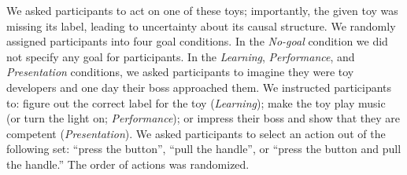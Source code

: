 \documentclass[10pt, letterpaper]{article}
\begin{document}
We asked participants to act on one of these toys; importantly, the
given toy was missing its label, leading to uncertainty about its causal
structure. We randomly assigned participants into four goal conditions.
In the \emph{No-goal} condition we did not specify any goal for
participants. In the \emph{Learning}, \emph{Performance}, and
\emph{Presentation} conditions, we asked participants to imagine they
were toy developers and one day their boss approached them. We
instructed participants to: figure out the correct label for the toy
(\emph{Learning}); make the toy play music (or turn the light on;
\emph{Performance}); or impress their boss and show that they are
competent (\emph{Presentation}). We asked participants to select an
action out of the following set: ``press the button'', ``pull the
handle'', or ``press the button and pull the handle.'' The order of
actions was randomized.
\end{document}
